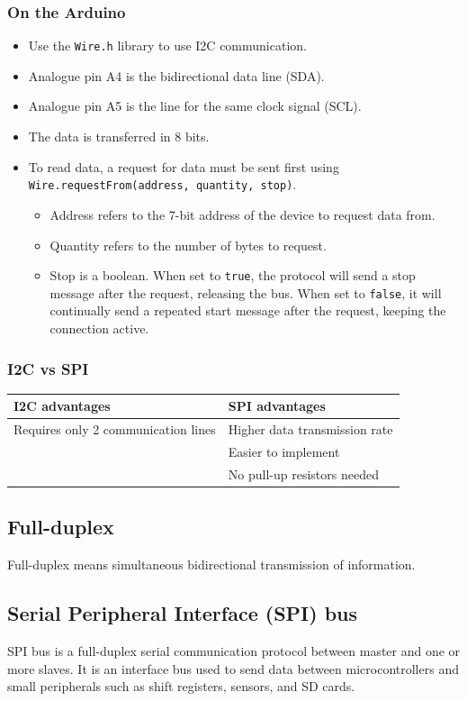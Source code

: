 \documentclass[11pt]{article}
\begin{document}
\subsubsection{On the Arduino}
\label{sec:org381eb5e}
\begin{itemize}
\item Use the \texttt{Wire.h} library to use I2C communication.
\item Analogue pin A4 is the bidirectional data line (SDA).
\item Analogue pin A5 is the line for the same clock signal (SCL).
\item The data is transferred in 8 bits.
\item To read data, a request for data must be sent first using \texttt{Wire.requestFrom(address, quantity, stop)}.
\begin{itemize}
\item Address refers to the 7-bit address of the device to request data from.
\item Quantity refers to the number of bytes to request.
\item Stop is a boolean. When set to \texttt{true}, the protocol will send a stop message after the request, releasing the bus. When set to \texttt{false}, it will continually send a repeated start message after the request, keeping the connection active.
\end{itemize}
\end{itemize}
\subsubsection{I2C vs SPI}
\label{sec:org06d5ed2}
\begin{center}
\begin{tabular}{l|l}
I2C advantages & SPI advantages\\
\hline
Requires only 2 communication lines & Higher data transmission rate\\
 & Easier to implement\\
 & No pull-up resistors needed\\
\end{tabular}
\end{center}
\subsection{Full-duplex}
\label{sec:org1a6d199}
Full-duplex means simultaneous bidirectional transmission of information.

 \newpage
\subsection{Serial Peripheral Interface (SPI) bus}
\label{sec:orgfd1107f}
SPI bus is a full-duplex serial communication protocol between master and one or more slaves. It is an interface bus used to send data between microcontrollers and small peripherals such as shift registers, sensors, and SD cards.
\end{document}
